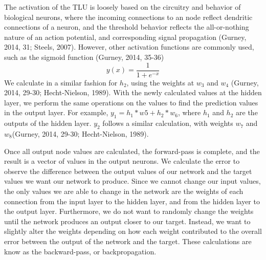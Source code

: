 \documentclass[11pt,titlepage]{article}
\begin{document}
The activation of the TLU is loosely based on the circuitry and behavior of biological neurons, where the incoming connections to an node reflect dendritic connections of a neuron, and the threshold behavior reflects the all-or-nothing nature of an action potential, and corresponding signal propagation (Gurney, 2014, 31; Steels, 2007). However, other activation functions are commonly used, such as the sigmoid function (Gurney, 2014, 35-36) $$y(x) = \frac{1}{1+e^{-x}}$$ We calculate in a similar fashion for $h_2$, using the weights at $w_3$ and $w_4$ (Gurney, 2014, 29-30; Hecht-Nielson, 1989). With the newly calculated values at the hidden layer, we perform the same operations on the values to find the prediction values in the output layer. For example, $y_1 = h_1*w5 + h_2*w_6$, where $h_1$ and $h_2$ are the outputs of the hidden layer. $y_2$ follows a similar calculation, with weights $w_7$ and $w_8$(Gurney, 2014, 29-30; Hecht-Nielson, 1989). \par
Once all output node values are calculated, the forward-pass is complete, and the result is a vector of values in the output neurons. We calculate the error to observe the difference between the output values of our network and the target values we want our network to produce. Since we cannot change our input values, the only values we are able to change in the network are the weights of each connection from the input layer to the hidden layer, and from the hidden layer to the output layer. Furthermore, we do not want to randomly change the weights until the network produces an output closer to our target. Instead, we want to slightly alter the weights depending on how each weight contributed to the overall error between the output of the network and the target. These calculations are know as the backward-pass, or backpropagation.\par
\end{document}
